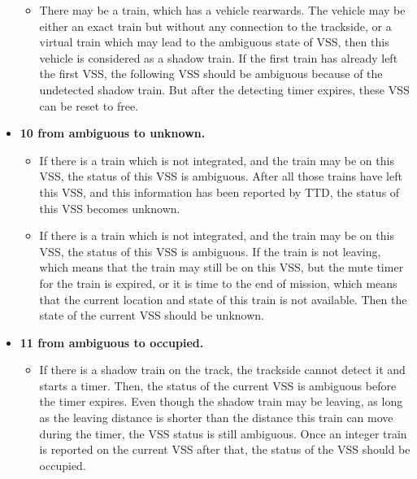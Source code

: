 \documentclass[article,dr=phil,type=drfinal,colorback,accentcolor=tud9c]{tudthesis}
\begin{document}
\begin{itemize}
\begin{itemize}
	\item 
	
    There may be a train, which has a vehicle rearwards. The vehicle may be either an exact train but without any connection to the trackside, or a virtual train which may lead to the ambiguous state of VSS, then this vehicle is considered as a shadow train. If the first train has already left the first VSS, the following VSS should be ambiguous because of the undetected shadow train. But after the detecting timer expires, these VSS can be reset to free.
	
    \end{itemize}  
  	
  	\item \textbf{10 from ambiguous to unknown.}
  	
  	\begin{itemize}
	
	\item 
	
	If there is a train which is not integrated, and the train may be on this VSS, the status of this VSS is ambiguous. After all those trains have left this VSS, and this information has been reported by TTD, the status of this VSS becomes unknown.
	
	\item 
	
	If there is a train which is not integrated, and the train may be on this VSS, the status of this VSS is ambiguous. If the train is not leaving, which means that the train may still be on this VSS, but the mute timer for the train is expired, or it is time to the end of mission, which means that the current location and state of this train is not available. Then the state of the current VSS should be unknown.
	
    \end{itemize}    	
  	
  	\item \textbf{11 from ambiguous to occupied.}
  	
  	\begin{itemize}
	
	\item 
	
	If there is a shadow train on the track, the trackside cannot detect it and starts a timer. Then, the status of the current VSS is ambiguous before the timer expires. Even though the shadow train may be leaving, as long as the leaving distance is shorter than the distance this train can move during the timer, the VSS status is still ambiguous. Once an integer train is reported on the current VSS after that, the status of the VSS should be occupied.
	

\end{itemize}
\end{itemize}
\end{document}
